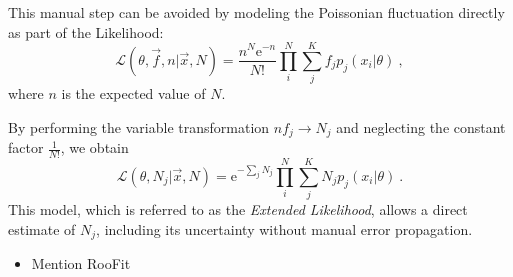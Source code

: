 This manual step can be avoided by modeling the Poissonian fluctuation directly as part of the Likelihood:
\begin{equation}
  \mathcal{L}(θ, \vec{f}, n | \vec{x}, N) = \frac{n^N\mathrm{e}^{-n}}{N!}  \prod_i^N \sum_j^K f_j p_j(x_i | θ)\:,
\end{equation}
where $n$ is the expected value of $N$.

By performing the variable transformation $n f_j \to N_j$ and neglecting the constant factor $\frac{1}{N!}$, we obtain
\begin{equation}
  \mathcal{L}(θ, N_j | \vec{x}, N) = \mathrm{e}^{-\sum_j N_j}  \prod_i^N \sum_j^K N_j p_j(x_i | θ)\:.
\end{equation}
This model, which is referred to as the \textit{Extended Likelihood}\cite{Lyons1986530}, allows a direct estimate of $N_j$, including its uncertainty without manual error propagation.

\begin{itemize}
  \item Mention RooFit
\end{itemize}

